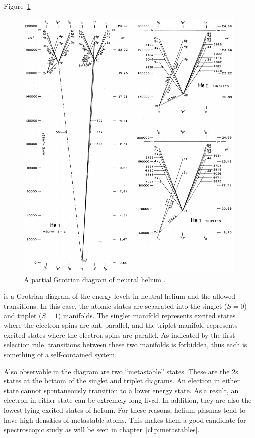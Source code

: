 Figure~\ref{fig:grotrian}
\begin{figure}
  \centering
  \includegraphics{./chapters/theory/figures/grotrian.pdf}
  \caption{A partial Grotrian diagram of neutral helium \cite{Moore1968}.}
  \label{fig:grotrian}
\end{figure}
is a Grotrian diagram of the energy levels in neutral helium and the allowed
transitions. In this case, the atomic states are separated into the singlet
($S=0$) and triplet ($S = 1$) manifolds. The singlet manifold represents excited
states where the electron spins are anti-parallel, and the triplet manifold
represents excited states where the electron spins are parallel. As indicated by
the first selection rule, transitions between these two manifolds is forbidden,
thus each is something of a self-contained system.

Also observable in the diagram are two ``metastable'' states. These are the 2s
states at the bottom of the singlet and triplet diagrams. An electron in either
state cannot spontaneously transition to a lower energy state. As a result, an
electron in either state can be extremely long-lived. In addition, they are also
the lowest-lying excited states of helium. For these reasons, helium plasmas
tend to have high densities of metastable atoms. This makes them a good
candidate for spectroscopic study as will be seen in
chapter~\ref{chp:metastables}.

